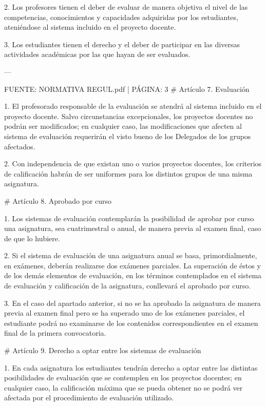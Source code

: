 \documentclass{article}
\begin{document}
\begin{itemize}
\begin{itemize}
\begin{scriptsize}
                  2. Los profesores tienen el deber de evaluar de manera objetiva el nivel de las competencias, conocimientos y capacidades adquiridas por los estudiantes, ateniéndose al sistema incluido en el proyecto docente.

                  3. Los estudiantes tienen el derecho y el deber de participar en las diversas actividades académicas por las que hayan de ser evaluados.

                  ---

                  FUENTE: NORMATIVA REGUL.pdf | PÁGINA: 3
                  \# Artículo 7. Evaluación

                  1. El profesorado responsable de la evaluación se atendrá al sistema incluido en el proyecto docente. Salvo circunstancias excepcionales, los proyectos docentes no podrán ser modificados; en cualquier caso, las modificaciones que afecten al sistema de evaluación requerirán el visto bueno de los Delegados de los grupos afectados.

                  2. Con independencia de que existan uno o varios proyectos docentes, los criterios de calificación habrán de ser uniformes para los distintos grupos de una misma asignatura.

                  \# Artículo 8. Aprobado por curso

                  1. Los sistemas de evaluación contemplarán la posibilidad de aprobar por curso una asignatura, sea cuatrimestral o anual, de manera previa al examen final, caso de que lo hubiere.

                  2. Si el sistema de evaluación de una asignatura anual se basa, primordialmente, en exámenes, deberán realizarse dos exámenes parciales. La superación de éstos y de los demás elementos de evaluación, en los términos contemplados en el sistema de evaluación y calificación de la asignatura, conllevará el aprobado por curso.

                  3. En el caso del apartado anterior, si no se ha aprobado la asignatura de manera previa al examen final pero se ha superado uno de los exámenes parciales, el estudiante podrá no examinarse de los contenidos correspondientes en el examen final de la primera convocatoria.

                  \# Artículo 9. Derecho a optar entre los sistemas de evaluación

                  1. En cada asignatura los estudiantes tendrán derecho a optar entre las distintas posibilidades de evaluación que se contemplen en los proyectos docentes; en cualquier caso, la calificación máxima que se pueda obtener no se podrá ver afectada por el procedimiento de evaluación utilizado.


\end{scriptsize}
\end{itemize}
\end{itemize}
\end{document}
